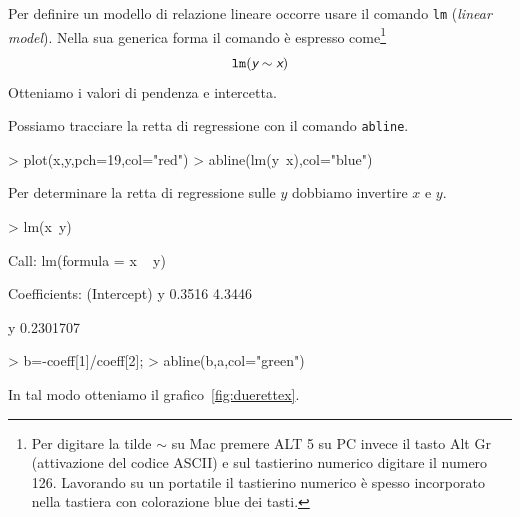 \documentclass[onecolumn,12pt]{book}
\newcommand{\varia}[1]{\textsl{\textsf{#1}}}
\newcommand{\mytilde}{$\sim$}
\begin{document}
Per definire un modello di relazione lineare occorre usare il comando \texttt{lm} (\varia{linear model}).
Nella sua generica forma il comando \`e espresso come\footnote{ Per digitare la tilde  \mytilde\;  su Mac premere ALT 5 su PC invece il tasto Alt Gr (attivazione del codice ASCII) e sul tastierino numerico digitare il numero 126. Lavorando su un portatile il tastierino numerico \`e spesso incorporato nella tastiera con colorazione blue dei tasti.}
$$\texttt{lm}(\varia{y} \sim  \varia{x})$$
Otteniamo i valori di pendenza e intercetta.

Possiamo tracciare la retta di regressione con il comando \texttt{abline}.
\begin{Schunk}
\begin{Sinput}
> plot(x,y,pch=19,col="red")
> abline(lm(y~x),col="blue")
\end{Sinput}
\end{Schunk}
Per determinare  la retta di regressione sulle $y$ dobbiamo invertire $x$ e $y$.
\begin{Schunk}
\begin{Sinput}
> lm(x~y)
\end{Sinput}
\begin{Soutput}
Call:
lm(formula = x ~ y)

Coefficients:
(Intercept)            y  
     0.3516       4.3446  
\end{Soutput}
\begin{Soutput}
        y 
0.2301707 
\end{Soutput}
\begin{Sinput}
> b=-coeff[1]/coeff[2];
> abline(b,a,col="green")
\end{Sinput}
\end{Schunk}
In tal modo otteniamo il grafico~\ref{fig:duerettex}.
\end{document}
